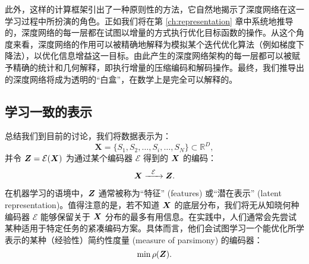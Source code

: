 \documentclass[../../book-main_zh.tex]{subfiles}
\begin{document}
此外，这样的计算框架引出了一种原则性的方法，它自然地揭示了深度网络在这一学习过程中所扮演的角色。正如我们将在第 \ref{ch:representation} 章中系统地推导的，深度网络的每一层都在试图以增量的方式执行优化目标函数的操作。从这个角度来看，深度网络的作用可以被精确地解释为模拟某个迭代优化算法（例如梯度下降法），以优化信息增益这一目标。由此产生的深度网络架构的每一层都可以被赋予精确的统计和几何解释，即执行增量的压缩编码和解码操作。最终，我们推导出的深度网络将成为透明的“白盒”，在数学上是完全可以解释的。











\subsection{学习一致的表示}

\label{sec:consistency}
总结我们到目前的讨论，我们将数据表示为：
\begin{equation}
    \boldsymbol{X} = \{S_1, S_2, \ldots, S_i, \ldots, S_N\} \subset \mathbb{R}^D,
\end{equation}
并令 $\boldsymbol{Z} = \mathcal{E}(\bm{X})$ 为通过某个编码器 $\mathcal{E}$ 得到的 $\bm{X}$ 的编码：
\begin{equation}
    \bm{X}  \xrightarrow{\hspace{2mm} \mathcal{E}\hspace{2mm}} \bm{Z}.
    \label{eqn:open-loop}
\end{equation}

在机器学习的语境中，$\bm{Z}$ 通常被称为“特征” (features) 或“潜在表示” (latent representation)。值得注意的是，若不知道 $\bm{X}$ 的底层分布，我们将无从知晓何种编码器 $\mathcal{E}$ 能够保留关于 $\bm{X}$ 分布的最多有用信息。在实践中，人们通常会先尝试某种适用于特定任务的紧凑编码方案。具体而言，他们会试图学习一个能优化所学表示的某种（经验性）简约性度量 (measure of parsimony) 的编码器：
\begin{equation}
    \min \rho(\bm{Z}). 
\end{equation}
\end{document}
